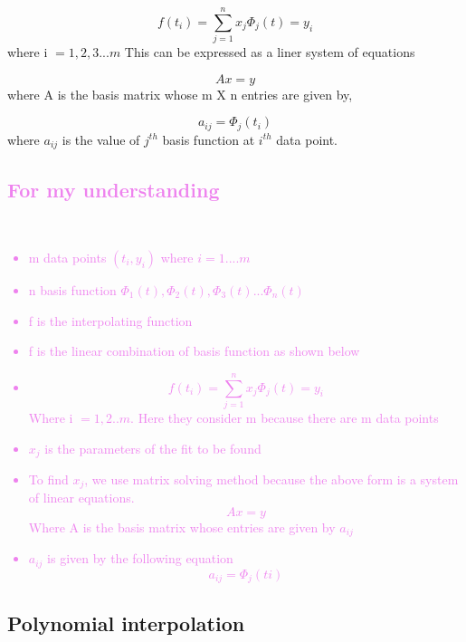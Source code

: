 \documentclass[12pt]{article}
\begin{document}
\begin{equation*}
f(t_i) = \sum_{j=1}^{n}x_j \Phi_j (t) = y_i
\end{equation*}
where i $= 1,2,3...m$
This can be expressed as a liner system of equations 

\begin{equation*}
Ax = y
\end{equation*}
where A is the basis matrix whose m X n entries are given by,

\begin{equation*}
a_{ij} = \Phi_j(t_i) 
\end{equation*} 
where $a_{ij}$ is the value of $j^{th}$ basis function at $i^{th}$ data point.

\textcolor{violet}{
\subsection{For my understanding}
}\\
\textcolor{violet}{
\begin{itemize}
	\item m data points $(t_i,y_i)$ where $ i = 1.... m$
	\item n basis function $\Phi_1(t) , \Phi_2(t), \Phi_3(t)... \Phi_n(t)$
	\item f is the interpolating function
	\item f is the linear combination of basis function as shown below
	\item 
	\begin{equation*}
	f(t_i) = \sum_{j=1}^{n}x_j \Phi_j (t) = y_i
	\end{equation*}
	Where i $= 1, 2 ..m$. Here they consider m because there are m data points
	\item $x_j$ is the parameters of the fit to be found
	\item To find $x_j$, we use matrix solving method because the above form is a system of linear equations.
	 \begin{equation*}
	Ax = y
	\end{equation*}
	Where A is the basis matrix whose entries are given by $a_{ij}$ 
	\item $a_{ij}$ is given by the following equation
	\begin{equation*}
	a_{ij} = \Phi_j (ti)
	\end{equation*}
\end{itemize} 
}

\subsection{Polynomial interpolation}
\end{document}
